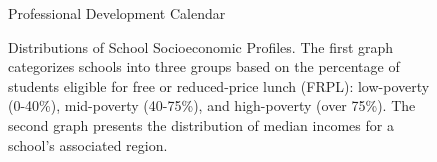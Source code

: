 \documentclass[
  number,
  preprint,
  3p,
  onecolumn]{elsarticle}
\begin{document}
\begin{figure}


\caption{\label{fig-prof-dev}Professional Development Calendar}

\end{figure}%

\newpage{}

\begin{figure}

\begin{minipage}{0.50\linewidth}



\end{minipage}%
%
\begin{minipage}{0.50\linewidth}



\end{minipage}%

\caption{\label{fig-income-dist}Distributions of School Socioeconomic
Profiles. The first graph categorizes schools into three groups based on
the percentage of students eligible for free or reduced-price lunch
(FRPL): low-poverty (0-40\%), mid-poverty (40-75\%), and high-poverty
(over 75\%). The second graph presents the distribution of median
incomes for a school's associated region.}

\end{figure}%
\end{document}
